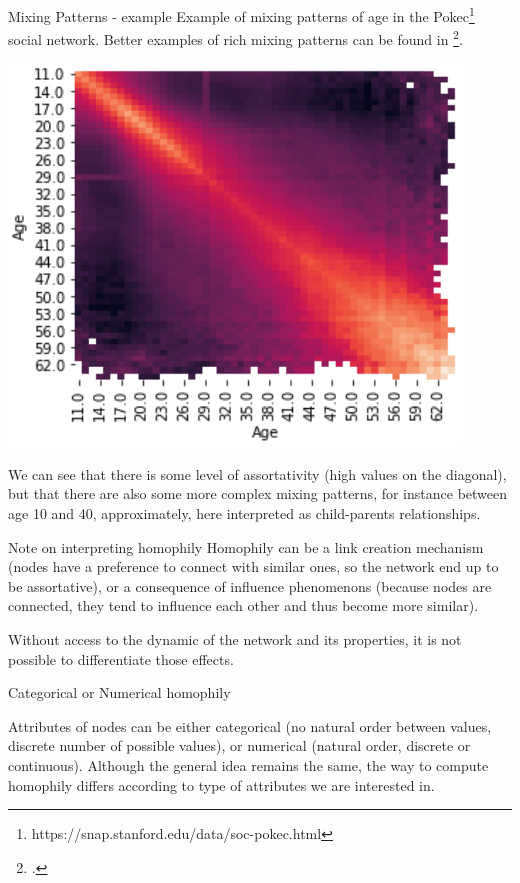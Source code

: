 \documentclass[a4paper,11pt]{book}
\begin{document}
\begin{textbox}{Mixing Patterns - example}
Example of mixing patterns of age in the Pokec\footnote{https://snap.stanford.edu/data/soc-pokec.html} social  network. Better examples of rich mixing patterns can be found in \footcite{del2007mixing}.

\centering

\includegraphics[width=0.9\textwidth]{pics/mixing_patterns.png}

We can see that there is some level of assortativity (high values on the diagonal), but that there are also some more complex mixing patterns, for instance between age 10 and 40, approximately, here interpreted as child-parents relationships.

\end{textbox}



\begin{textbox}{Note on interpreting homophily}
Homophily can be a link creation mechanism (nodes have a preference to connect with similar ones, so the network end up to be assortative), or a consequence of influence phenomenons (because nodes are connected, they tend to influence each other and thus become more similar).

Without access to the dynamic of the network and its properties, it is not possible to differentiate those effects.
\end{textbox}





\begin{textbox}{Categorical or Numerical homophily}

Attributes of nodes can be either categorical (no natural order between values, discrete number of possible values), or numerical (natural order, discrete or continuous). Although the general idea remains the same, the way to compute homophily differs according to type of attributes we are interested in.
\end{textbox}
\end{document}
